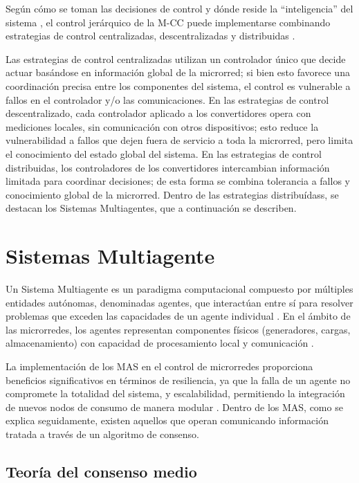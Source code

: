 Según cómo se toman las decisiones de control y dónde reside la ``inteligencia'' del sistema \cite{AlIsmail2021}, el control jerárquico de la M-CC puede implementarse combinando estrategias de control centralizadas, descentralizadas y distribuidas \cite{Ahmad2025}. 

Las estrategias de control centralizadas utilizan un controlador único que decide actuar basándose en información global de la microrred; si bien esto favorece una coordinación precisa entre los componentes del sistema, el control es vulnerable a fallos en el controlador y/o las comunicaciones. En las estrategias de control descentralizado, cada controlador aplicado a los convertidores opera con mediciones locales, sin comunicación con otros dispositivos; esto reduce la vulnerabilidad a fallos que dejen fuera de servicio a toda la microrred, pero limita el conocimiento del estado global del sistema. En las estrategias de control distribuidas, los controladores de los convertidores intercambian información limitada para coordinar decisiones; de esta forma se combina tolerancia a fallos y conocimiento global de la microrred. Dentro de las estrategias distribuídass, se destacan los Sistemas Multiagentes, que a continuación se describen.

\section{Sistemas Multiagente}
Un Sistema Multiagente es un paradigma computacional compuesto por múltiples entidades autónomas, denominadas agentes, que interactúan entre sí para resolver problemas que exceden las capacidades de un agente individual \cite{Stennikov2022}. En el ámbito de las microrredes, los agentes representan componentes físicos (generadores, cargas, almacenamiento) con capacidad de procesamiento local y comunicación \cite{Altin2023}.

La implementación de los MAS en el control de microrredes proporciona beneficios significativos en términos de resiliencia, ya que la falla de un agente no compromete la totalidad del sistema, y escalabilidad, permitiendo la integración de nuevos nodos de consumo de manera modular \cite{Altin2023}. Dentro de los MAS, como se explica seguidamente, existen aquellos que operan comunicando información tratada a través de un algoritmo de consenso. 

\subsection{Teoría del consenso medio}
\label{sec:consenso_medio}

